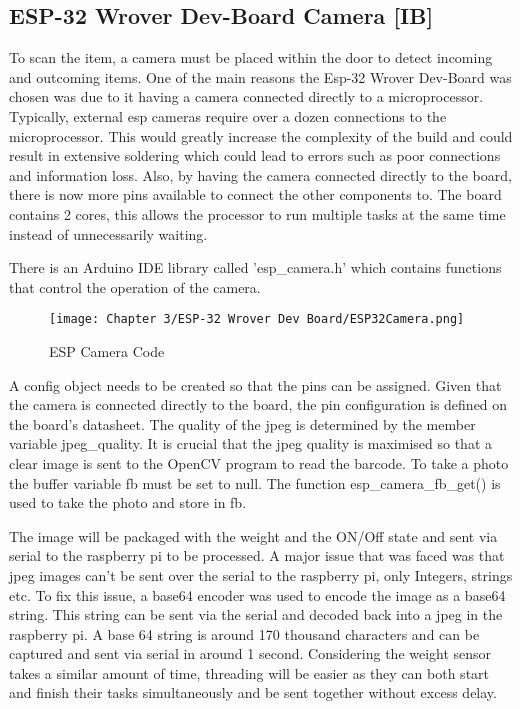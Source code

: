 \subsection{ESP-32 Wrover Dev-Board Camera [IB]}

To scan the item, a camera must be placed within the door to detect incoming and outcoming items.
One of the main reasons the Esp-32 Wrover Dev-Board was chosen was due to it having a camera connected directly to a microprocessor.
Typically, external esp cameras require over a dozen connections to the microprocessor.
This would greatly increase the complexity of the build and could result in extensive soldering which could lead to errors such as poor connections and information loss.
Also, by having the camera connected directly to the board, there is now more pins available to connect the other components to.
The board contains 2 cores, this allows the processor to run multiple tasks at the same time instead of unnecessarily waiting.

There is an Arduino IDE library called 'esp\_camera.h' which contains functions that control the operation of the camera.

\begin{figure}[H]        
    \centering
    \texttt{[image: Chapter 3/ESP-32 Wrover Dev Board/ESP32Camera.png]}
    \caption{ESP Camera Code}
    \label{fig:espcamcode}
\end{figure} 

A config object needs to be created so that the pins can be assigned.
Given that the camera is connected directly to the board, the pin configuration is defined on the board's datasheet.
The quality of the jpeg is determined by the member variable jpeg\_quality.
It is crucial that the jpeg quality is maximised so that a clear image is sent to the OpenCV program to read the barcode.
To take a photo the buffer variable fb must be set to null.
The function esp\_camera\_fb\_get() is used to take the photo and store in fb.

The image will be packaged with the weight and the ON/Off state and sent via serial to the raspberry pi to be processed.
A major issue that was faced was that jpeg images can't be sent over the serial to the raspberry pi, only Integers, strings etc.
To fix this issue, a base64 encoder was used to encode the image as a base64 string.
This string can be sent via the serial and decoded back into a jpeg in the raspberry pi.
A base 64 string is around 170 thousand characters and can be captured and sent via serial in around 1 second.
Considering the weight sensor takes a similar amount of time, threading will be easier as they can both start and finish their tasks simultaneously and be sent together without excess delay.

